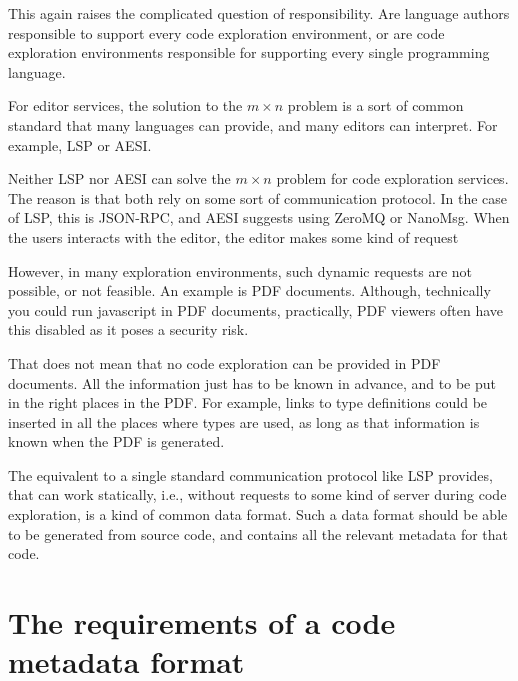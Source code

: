 This again raises the complicated question of responsibility.
Are language authors responsible to support every code exploration environment, or are code exploration environments
responsible for supporting every single programming language.

For editor services, the solution to the $m \times n$ problem is a sort of common standard that many languages can provide,
and many editors can interpret.
For example, \ac{LSP} or \ac{AESI}.

Neither \ac{LSP} nor \ac{AESI} can solve the $m \times n$ problem for code exploration services.
The reason is that both rely on some sort of communication protocol.
In the case of \ac{LSP}, this is \ac{JSON-RPC}, and \ac{AESI} suggests using ZeroMQ or NanoMsg. 
When the users interacts with the editor, the editor makes some kind of request

However, in many exploration environments, such dynamic requests are not possible, or not feasible.
An example is \ac{PDF} documents.
Although, technically you could run javascript in \ac{PDF} documents, practically, \ac{PDF} viewers often have this
disabled as it poses a security risk.

That does not mean that no code exploration can be provided in \ac{PDF} documents.
All the information just has to be known in advance, and to be put in the right places in the \ac{PDF}.
For example, links to type definitions could be inserted in all the places where types are used, as long as that information
is known when the \ac{PDF} is generated.

The equivalent to a single standard communication protocol like \ac{LSP} provides, that can work statically, i.e.,
without requests to some kind of server during code exploration, is a kind of common data format.
Such a data format should be able to be generated from source code, and contains all the relevant metadata for that code.

\section{The requirements of a code metadata format}

